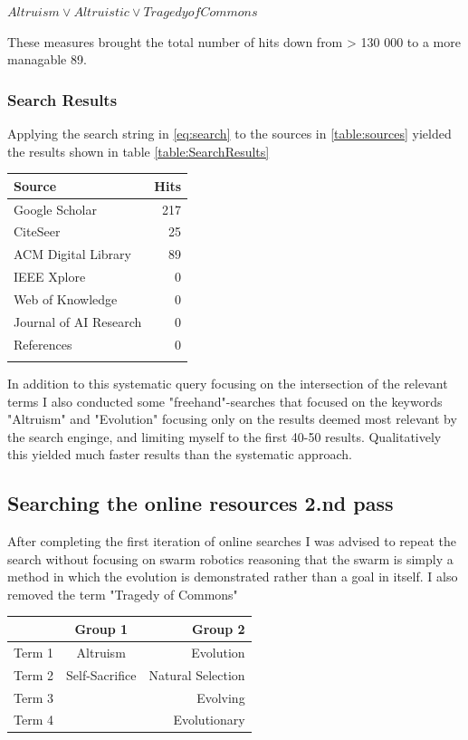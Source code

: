 \documentclass[a4paper]{book}
\begin{document}
$Altruism \lor Altruistic \lor Tragedy of Commons$

These measures brought the total number of hits down from > 130 000 to a more  
managable 89. 

\subsubsection{Search Results}

Applying the search string in \ref{eq:search} to the sources in \ref{table:sources} yielded the results shown in table \ref{table:SearchResults}

\begin{center}
    \begin{tabular}{|l|r|}
    \hline
    Source & Hits \\ \hline
    Google Scholar & 217 \\ \hline
    CiteSeer    &   25 \\ \hline
    ACM Digital Library & 89 \\ \hline
    IEEE Xplore & 0  \\ \hline
    Web of Knowledge & 0 \\ \hline
    Journal of AI Research & 0 \\ \hline
    References  &   0 \\ 
    \hline
     \label{table:SearchResults}
   \end{tabular}
\end{center}

In addition to this systematic query focusing on the intersection of the relevant terms I also conducted some 
"freehand"-searches that focused on the keywords "Altruism" and "Evolution" focusing only on the results deemed
most relevant by the search enginge, and limiting myself to the first 40-50 results. Qualitatively this yielded 
much faster results than the systematic approach.

\subsection{Searching the online resources 2.nd pass}

After completing the first iteration of online searches I was advised to repeat the search without focusing on swarm robotics
reasoning that the swarm is simply a method in which the evolution is demonstrated rather than a goal in itself. I also removed
the term "Tragedy of Commons"

\begin{center}
    \begin{tabular}{| l | c | r |}
      \hline
       & Group 1 & Group 2 \\ \hline
       Term 1 & Altruism 	& Evolution  \\ \hline
       Term 2 & Self-Sacrifice	& Natural Selection \\ \hline
       Term 3 & 		& Evolving   \\ \hline
       Term 4 & 		& Evolutionary  \\ \hline
       \hline
       \end{tabular}
      \end{center}
      
\end{document}
